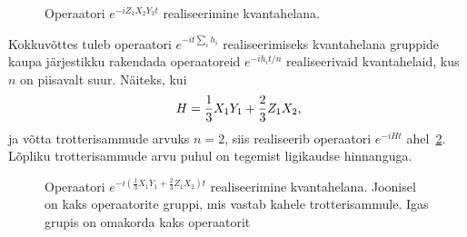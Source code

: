 \documentclass[12pt]{report}
\def\paren#1{\left(#1\right)}
\begin{document}
\begin{figure}[h]
  \centering
  \ifdefined\yquanton
  \fi
  \caption{Operaatori \(e^{-iZ_1X_2Y_3t}\) realiseerimine kvantahelana.}
  \label{f:xyzex}
\end{figure}

Kokkuvõttes tuleb operaatori \(e^{-i t \sum_i h_i}\) realiseerimiseks kvantahelana gruppide kaupa järjestikku rakendada operaatoreid \(e^{-i h_i t/n}\) realiseerivaid kvantahelaid, kus \(n\) on piisavalt suur.
Näiteks, kui
\begin{align}\label{eq:hex}
    H=\frac{1}{3}X_1Y_1+\frac{2}{3}Z_1X_2 \rlap{,}
\end{align}
ja võtta trotterisammude arvuks \(n = 2\), siis realiseerib operaatori \(e^{-i Ht}\) ahel~\ref{fig:trot}.
Lõpliku trotterisammude arvu puhul on tegemist ligikaudse hinnanguga.

\begin{figure}
    \centering
    \ifdefined\yquanton
    \fi
    \caption{Operaatori \(e^{-i\paren{\frac{1}{3}X_1Y_1+\frac{2}{3}Z_1X_2} t}\) realiseerimine kvantahelana.
    Joonisel on kaks operaatorite gruppi, mis vastab kahele trotterisammule.
    Igas grupis on omakorda kaks operaatorit}
    \label{fig:trot}
\end{figure}
\end{document}
